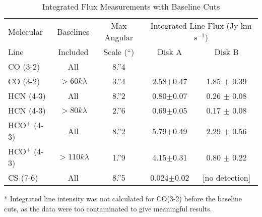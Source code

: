 

\begin{table}
  \begin{threeparttable}
    \centering
    \caption{Integrated Flux Measurements with Baseline Cuts}
    \label{tab:baseline_cutting_table}
    \renewcommand{\arraystretch}{1.2}
    \begin{tabular}{l | c | c | c  c }
      \toprule \toprule
      {Molecular}     & Baselines       & Max Angular      & \multicolumn{2}{c}{Integrated Line Flux (Jy km s$^{-1}$)} \\
      Line            & Included        & Scale (``)       & Disk A        & Disk B \\
      \midrule %
      CO (3-2)        & All             & 8.''4        & \tnote{*}      &  \tnote{*} \\
      CO (3-2)        & $>60 k\lambda$  & 3.''4        & 2.58$\pm$0.47  & 1.85 $\pm$ 0.39 \\
      HCN (4-3)       & All             & 8.''2        & 0.80$\pm$0.07  &  0.26 $\pm$ 0.08 \\
      HCN (4-3)       & $>80 k\lambda$  & 2.''6        & 0.69$\pm$0.05  &  0.17 $\pm$ 0.08 \\
      HCO$^{+}$ (4-3) & All             & 8.''2        & 5.79$\pm$0.49  &  2.29 $\pm$ 0.56 \\
      HCO$^{+}$ (4-3) & $>110 k\lambda$ & 1.''9        & 4.15$\pm$0.31  &  0.80 $\pm$ 0.22 \\
      CS (7-6)        & All             & 8.''5        & 0.024$\pm$0.02 & [no detection] \\
      \bottomrule
    \end{tabular}
    \begin{tablenotes}\footnotesize
      \item[*] Integrated line intensity was not calculated for CO(3-2) before the baseline cuts, as the data were too contaminated to give meaningful results.
    \end{tablenotes}
  \end{threeparttable}
\end{table}








